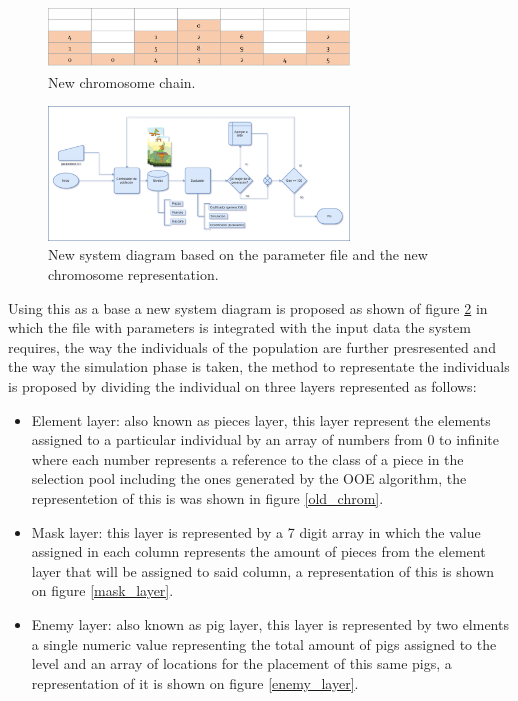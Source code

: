 \documentclass[conference]{IEEEtran}
\begin{document}
\begin{figure}[htbp]
\centerline{\includegraphics[width=80mm]{Images/chromosome_chain_new_model.png}}
\caption{New chromosome chain.}
\label{new_chrom}
\end{figure}

\begin{figure}[htbp]
\centerline{\includegraphics[width=80mm]{Images/new_model.png}}
\caption{New system diagram based on the parameter file and the new chromosome representation.}
\label{new_model}
\end{figure}

Using this as a base a new system diagram is proposed as shown of figure \ref{new_model} in which the file with parameters is integrated with the input data  the system requires, the way the individuals of the population are further presresented and the way the simulation phase is taken, the method to representate the individuals is proposed by dividing the individual on three layers represented as follows:

\begin{itemize}
    \item Element layer: also known as pieces layer, this layer represent the elements assigned to a particular individual by an array of numbers from 0 to infinite where each number represents a reference to the class of a piece in the selection pool including the ones generated by the OOE algorithm, the representetion of this is was shown in figure \ref{old_chrom}.
    \item  Mask layer: this layer is represented by a 7 digit array in which the value assigned in each column represents the amount of pieces from the element layer that will be assigned to said column, a representation of this is shown on figure \ref{mask_layer}.
    \item Enemy layer: also known as pig layer, this layer is represented by two elments a single numeric value representing the total amount of pigs assigned to the level and an array of locations for the placement of this same pigs, a representation of it is shown on figure \ref{enemy_layer}. 
\end{itemize}
\end{document}
